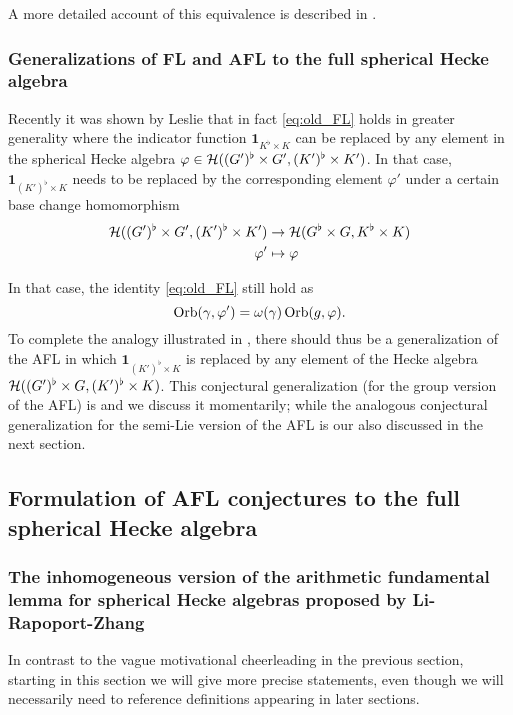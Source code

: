 A more detailed account of this equivalence is described in \cite[\S1.4]{ref:liuFJ}.

\subsubsection{Generalizations of FL and AFL to the full spherical Hecke algebra}
Recently it was shown by Leslie \cite{ref:leslie} that in fact
\eqref{eq:old_FL} holds in greater generality where the indicator function
$\mathbf{1}_{K^\flat \times K}$ can be replaced by any element in the spherical
Hecke algebra $\varphi \in \mathcal H((G')^\flat \times G', (K')^\flat \times K')$.
In that case, $\mathbf{1}_{(K')^\flat \times K}$ needs to be replaced
by the corresponding element $\varphi'$ under a certain base change homomorphism
\begin{align*}
  \mathcal H((G')^\flat \times G', (K')^\flat \times K') &\to \mathcal H(G^\flat \times G, K^\flat \times K) \\
  \varphi' &\mapsto \varphi
\end{align*}

In that case, the identity \eqref{eq:old_FL} still hold as
\begin{equation}
  \operatorname{Orb}(\gamma, \varphi') = \omega(\gamma) \operatorname{Orb}(g, \varphi).
  \label{eq:eq:leslie_FL}
\end{equation}
To complete the analogy illustrated in ,
there should thus be a generalization of the AFL in which
$\mathbf{1}_{(K')^\flat \times K}$ is replaced by any element of the Hecke algebra
$\mathcal H((G')^\flat \times G, (K')^\flat \times K)$.
This conjectural generalization
(for the group version of the AFL) is \cite{ref:AFLspherical}
and we discuss it momentarily;
while the analogous conjectural generalization for the semi-Lie version of the AFL
is our  also discussed in the next section.

\subsection{Formulation of AFL conjectures to the full spherical Hecke algebra}
\subsubsection{The inhomogeneous version of the arithmetic fundamental lemma for spherical Hecke algebras proposed by Li-Rapoport-Zhang}
In contrast to the vague motivational cheerleading in the previous section,
starting in this section we will give more precise statements,
even though we will necessarily need to reference definitions appearing in later sections.

